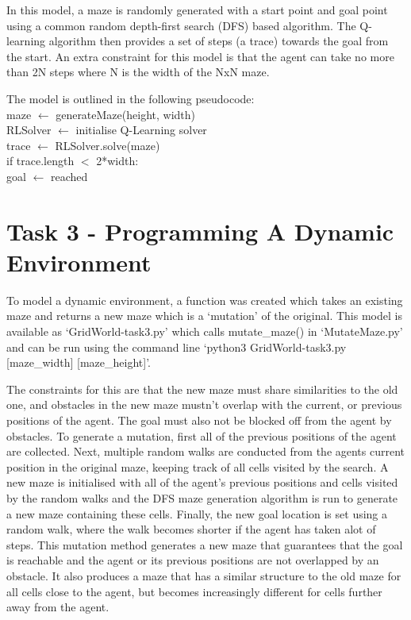 \documentclass{article}
\begin{document}
In this model, a maze is randomly generated with a start point and goal point using a common random depth-first search (DFS) based algorithm. The Q-learning algorithm then provides a set of steps (a trace) towards the goal from the start. An extra constraint for this model is that the agent can take no more than 2N steps where N is the width of the NxN maze. 

The model is outlined in the following pseudocode:\\
\hspace*{4cm}maze $\leftarrow$ generateMaze(height, width)\\
\hspace*{4cm}RLSolver $\leftarrow$ initialise Q-Learning solver\\
\hspace*{4cm}trace $\leftarrow$ RLSolver.solve(maze)\\
\hspace*{4cm}if trace.length $<$ 2*width:\\
\hspace*{5cm}goal $\leftarrow$ reached


\section{Task 3 - Programming A Dynamic Environment}\label{sec:test-design}
	To model a dynamic environment, a function was created which takes an existing maze and returns a new maze which is a ‘mutation’ of the original. This model is available as ‘GridWorld-task3.py’ which calls mutate\_maze() in ‘MutateMaze.py’ and can be run using the command line ‘python3 GridWorld-task3.py [maze\_width] [maze\_height]’. 

	The constraints for this are that the new maze must share similarities to the old one, and obstacles in the new maze mustn’t overlap with the current, or previous positions of the agent. The goal must also not be blocked off from the agent by obstacles. To generate a mutation, first all of the previous positions of the agent are collected. Next, multiple random walks are conducted from the agents current position in the original maze, keeping track of all cells visited by the search. A new maze is initialised with all of the agent’s previous positions and cells visited by the random walks and the DFS maze generation algorithm is run to generate a new maze containing these cells. Finally, the new goal location is set using a random walk, where the walk becomes shorter if the agent has taken alot of steps. This mutation method generates a new maze that guarantees that the goal is reachable and the agent or its previous positions are not overlapped by an obstacle. It also produces a maze that has a similar structure to the old maze for all cells close to the agent, but becomes increasingly different for cells further away from the agent. 
\end{document}
